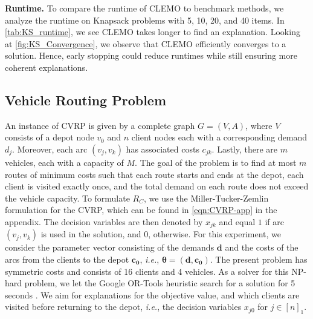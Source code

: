 \documentclass{article}
\theoremstyle{plain}
\theoremstyle{definition}
\theoremstyle{remark}
\begin{document}
\textbf{Runtime.} To compare the runtime of CLEMO to benchmark methods, we analyze the runtime on Knapsack problems with 5, 10, 20, and 40 items. In \cref{tab:KS_runtime}, we see CLEMO takes longer to find an explanation. Looking at \cref{fig:KS_Convergence}, we observe that CLEMO efficiently converges to a solution. Hence, early stopping could reduce runtimes while still ensuring more coherent explanations.
\subsection{Vehicle Routing Problem}
An instance of CVRP is given by a complete graph $G=(V,A)$, where $V$ consists of a depot node $v_0$ and $n$ client nodes each with a corresponding demand $d_j$. Moreover, each arc $(v_j,v_k)$ has associated costs $c_{jk}$. Lastly, there are $m$ vehicles, each with a capacity of $M$. The goal of the problem is to find at most $m$ routes of minimum costs such that each route starts and ends at the depot, each client is visited exactly once, and the total demand on each route does not exceed the vehicle capacity. To formulate $R_C$, we use the Miller-Tucker-Zemlin formulation for the CVRP, which can be found in \cref{eqn:CVRP-app} in the appendix. The decision variables are then denoted by $x_{jk}$ and equal $1$ if arc $(v_j,v_k)$ is used in the solution, and $0$, otherwise. 
For this experiment, we consider the parameter vector consisting of the demands $\bm{d}$ and the costs of the arcs from the clients to the depot $\bm{c_0}$, \textit{i.e.}, $\bm{\theta}=(\bm{d},\bm{c_0})$. The present problem has symmetric costs and consists of 16 clients and 4 vehicles. As a solver for this NP-hard problem, we let the Google OR-Tools heuristic search for a solution for 5 seconds \cite{ortools_routing}. We aim for explanations for the objective value, and which clients are visited before returning to the depot, \textit{i.e.}, the decision variables $x_{j0}$ for $j\in [n]_1$.
\end{document}
